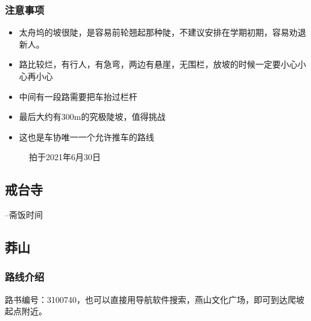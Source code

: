 \documentclass{ctexbook}
\begin{document}
\subsubsection{注意事项}
\begin{itemize}
    \item 太舟坞的坡很陡，是容易前轮翘起那种陡，不建议安排在学期初期，容易劝退新人。
    \item 路比较烂，有行人，有急弯，两边有悬崖，无围栏，放坡的时候一定要小心小心再小心
    \item 中间有一段路需要把车抬过栏杆
    \item 最后大约有300m的究极陡坡，值得挑战
    \item 这也是车协唯一一个允许推车的路线
\end{itemize}
\begin{figure}[!htb]
    \centering
       \quad 
        \caption{拍于2021年6月30日}
  \end{figure}
\subsection{戒台寺}
--斋饭时间
\newpage
\subsection{莽山}
\label{subsec:莽山}
\subsubsection{路线介绍}
路书编号：3100740，也可以直接用导航软件搜索，燕山文化广场，即可到达爬坡起点附近。
\end{document}
